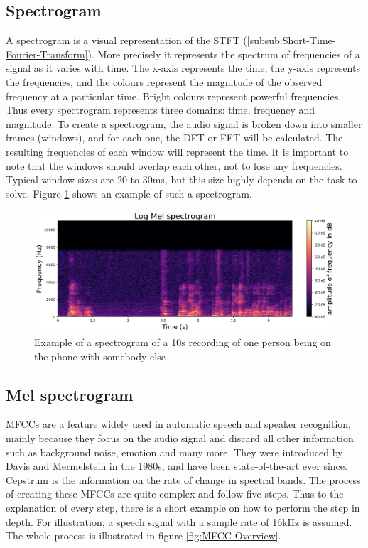 \subsection{Spectrogram}
\label{sub:Spectrogram}
A spectrogram is a visual representation of the \gls{STFT} (\ref{subsub:Short-Time-Fourier-Transform}). More precisely it represents the spectrum of frequencies of a signal as it varies with time. The x-axis represents the time, the y-axis represents the frequencies, and the colours represent the magnitude of the observed frequency at a particular time. Bright colours represent powerful frequencies. Thus every spectrogram represents three domains: time, frequency and magnitude.
\newline
\newline
To create a spectrogram, the audio signal is broken down into smaller frames (windows), and for each one, the \gls{DFT} or \gls{FFT} will be calculated. The resulting frequencies of each window will represent the time. It is important to note that the windows should overlap each other, not to lose any frequencies. Typical window sizes are 20 to 30ms, but this size highly depends on the task to solve. Figure \ref{fig:Spectrogram} shows an example of such a spectrogram.
\begin{figure}[htbp]
	\centering
	\includegraphics[scale=0.5]{img/log_mel_spectrogram.png}
	\caption{Example of a spectrogram of a 10s recording of one person being on the phone with somebody else}
	\label{fig:Spectrogram}
\end{figure}

\subsection{Mel spectrogram}
\label{sub:Mel-Spectrogram}
\Glspl{MFCC} are a feature widely used in automatic speech and speaker recognition, mainly because they focus on the audio signal and discard all other information such as background noise, emotion and many more. They were introduced by Davis and Mermelstein in the 1980s, and have been state-of-the-art ever since. Cepstrum is the information on the rate of change in spectral bands.
\newline
\newline
The process of creating these \glspl{MFCC} are quite complex and follow five steps. Thus to the explanation of every step, there is a short example on how to perform the step in depth. For illustration, a speech signal with a sample rate of 16kHz is assumed. The whole process is illustrated in figure \ref{fig:MFCC-Overview}.

